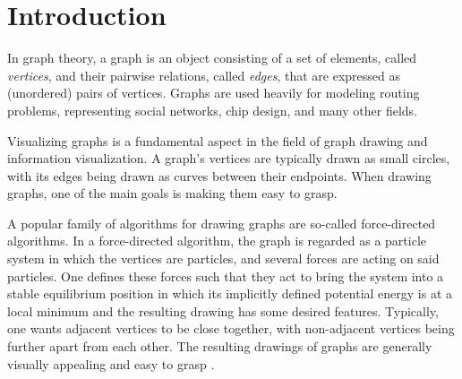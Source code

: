 \chapter{Introduction}
\label{chap:introduction}

In graph theory, a graph is an object consisting of a set of elements, called \emph{vertices}, and their pairwise relations, called \emph{edges}, that are expressed as (unordered) pairs of vertices. Graphs are used heavily for modeling routing problems, representing social networks, chip design, and many other fields.

Visualizing graphs is a fundamental aspect in the field of graph drawing and information visualization. A graph's vertices are typically drawn as small circles, with its edges being drawn as curves between their endpoints. When drawing graphs, one of the main goals is making them easy to grasp.

A popular family of algorithms for drawing graphs are so-called force-directed algorithms. In a force-directed algorithm, the graph is regarded as a particle system in which the vertices are particles, and several forces are acting on said particles. One defines these forces such that they act to bring the system into a stable equilibrium position in which its implicitly defined potential energy is at a local minimum and the resulting drawing has some desired features. Typically, one wants adjacent vertices to be close together, with non-adjacent vertices being further apart from each other. The resulting drawings of graphs are generally visually appealing and easy to grasp \cite{Kobourov}.




